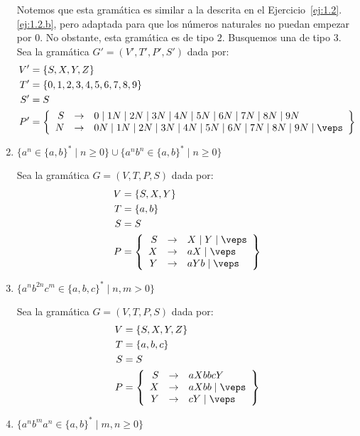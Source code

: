 \begin{ejercicio}
\begin{enumerate}
        Notemos que esta gramática es similar a la descrita en el Ejercicio~\ref{ej:1.2}.\ref{ej:1.2.b}, pero adaptada para que los números naturales no puedan empezar por $0$.
        No obstante, esta gramática es de tipo $2$. Busquemos una de tipo $3$.
        Sea la gramática $G'=\left(V',T',P',S'\right)$ dada por:
        \begin{align*}
            V' &= \{S, X, Y, Z\} \\
            T' &= \{0,1,2,3,4,5,6,7,8,9\} \\
            S' &= S \\
            P' &= \left\{
                \begin{array}{rcl}
                    S &\rightarrow & 0 \mid 1N \mid 2N \mid 3N \mid 4N \mid 5N \mid 6N \mid 7N \mid 8N \mid 9N\\
                    N &\rightarrow & 0N\mid 1N \mid 2N \mid 3N \mid 4N \mid 5N \mid 6N \mid 7N \mid 8N \mid 9N \mid \veps
                \end{array}
            \right\}
        \end{align*}
        \item $\{ a^n \in \{a,b\}^\ast \mid n\geq 0 \} \cup \{ a^nb^n \in \{a,b\}^\ast \mid n\geq 0 \}$
        
        Sea la gramática $G=\left(V,T,P,S\right)$ dada por:
        \begin{align*}
            V &= \{S, X, Y\} \\
            T &= \{a,b\} \\
            S &= S \\
            P &= \left\{
                \begin{array}{rcl}
                    S &\rightarrow & X \mid Y \mid \veps \\
                    X &\rightarrow & aX \mid \veps \\
                    Y &\rightarrow & aYb \mid \veps
                \end{array}
            \right\}
        \end{align*}
        \item $\{ a^nb^{2n}c^m \in \{a,b,c\}^\ast \mid n,m>0 \}$
        
        Sea la gramática $G=\left(V,T,P,S\right)$ dada por:
        \begin{align*}
            V &= \{S, X, Y, Z\} \\
            T &= \{a,b,c\} \\
            S &= S \\
            P &= \left\{
                \begin{array}{rcl}
                    S &\rightarrow & aXbbcY \\
                    X &\rightarrow & aXbb \mid \veps \\
                    Y &\rightarrow & cY \mid \veps
                \end{array}
            \right\}
        \end{align*}
        \item $\{ a^nb^ma^n \in \{a,b\}^\ast \mid m,n\geq 0 \}$
        

\end{enumerate}
\end{ejercicio}
